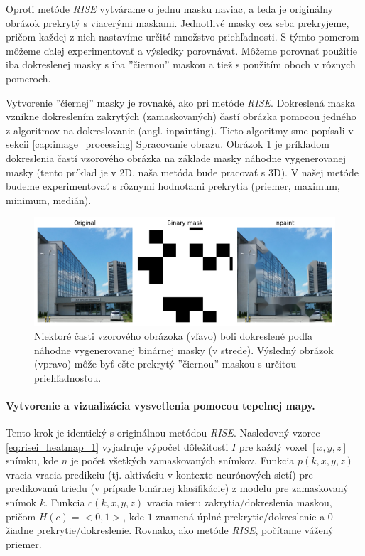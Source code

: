 Oproti metóde \textit{RISE} vytvárame o jednu masku naviac, a teda je originálny obrázok prekrytý s viacerými maskami. Jednotlivé masky cez seba prekryjeme, pričom každej z nich nastavíme určité množstvo priehľadnosti. S týmto pomerom môžeme ďalej experimentovať a výsledky porovnávať. Môžeme porovnať použitie iba dokreslenej masky s iba ''čiernou'' maskou a tiež s použitím oboch v rôznych pomeroch.

Vytvorenie ''čiernej'' masky je rovnaké, ako pri metóde \textit{RISE}. Dokreslená maska vznikne dokreslením zakrytých (zamaskovaných) častí obrázka pomocou jedného z algoritmov na dokreslovanie (angl. inpainting). Tieto algoritmy sme popísali v sekcii \ref{cap:image_processing} Spracovanie obrazu. Obrázok \ref{fig:risei_inpainting_example} je príkladom dokreslenia častí vzorového obrázka na základe masky náhodne vygenerovanej masky (tento príklad je v 2D, naša metóda bude pracovať s 3D). V našej metóde budeme experimentovať s rôznymi hodnotami prekrytia (priemer, maximum, minimum, medián).

\begin{figure}[h!]
    \centering
    \includegraphics[width=13cm]{assets/images/risei_inpainting_example.png}
    \caption{Niektoré časti vzorového obrázoka (vľavo) boli dokreslené podľa náhodne vygenerovanej binárnej masky (v strede). Výsledný obrázok (vpravo) môže byť ešte prekrytý ''čiernou'' maskou s určitou priehľadnosťou.}
    \label{fig:risei_inpainting_example}
\end{figure}

\paragraph{Vytvorenie a vizualizácia vysvetlenia pomocou tepelnej mapy.}

Tento krok je identický s originálnou metódou \textit{RISE}. Nasledovný vzorec \ref{eq:risei_heatmap_1} vyjadruje výpočet dôležitosti $I$ pre každý voxel $[x, y, z]$ snímku, kde $n$ je počet všetkých zamaskovaných snímkov. Funkcia $p(k, x, y, z)$ vracia vracia predikciu (tj. aktiváciu v kontexte neurónových sietí) pre predikovanú triedu (v prípade binárnej klasifikácie) z modelu pre zamaskovaný snímok $k$. Funkcia $c(k, x, y, z)$ vracia mieru zakrytia/dokreslenia maskou, pričom $H(c) = <0, 1>$, kde $1$ znamená úplné prekrytie/dokreslenie a $0$ žiadne prekrytie/dokreslenie. Rovnako, ako metóde \textit{RISE}, počítame vážený priemer.

